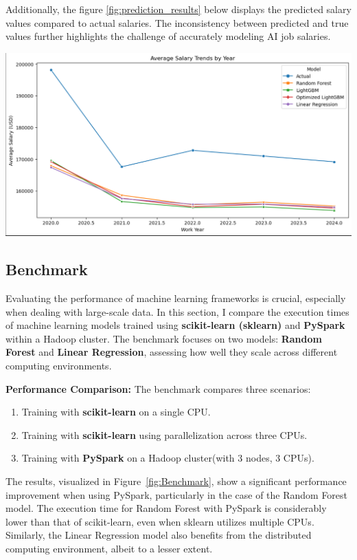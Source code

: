 \documentclass[12pt,a4paper]{article}
\begin{document}
\begin{multicols}{2}
Additionally, the figure \ref{fig:prediction_results} below displays the predicted salary values compared to actual salaries. The inconsistency between predicted and true values further highlights the challenge of accurately modeling AI job salaries.

\includegraphics[width=\linewidth]{prediction_result.jpg}
\label{fig:prediction_results}

\subsection{Benchmark}
Evaluating the performance of machine learning frameworks is crucial, especially when dealing with large-scale data. In this section, I compare the execution times of machine learning models trained using \textbf{scikit-learn (sklearn)} and \textbf{PySpark} within a Hadoop cluster. The benchmark focuses on two models: \textbf{Random Forest} and \textbf{Linear Regression}, assessing how well they scale across different computing environments.

\textbf{Performance Comparison:}  
The benchmark compares three scenarios:
\begin{enumerate}
    \item Training with \textbf{scikit-learn} on a single CPU.
    \item Training with \textbf{scikit-learn} using parallelization across three CPUs.
    \item Training with \textbf{PySpark} on a Hadoop cluster(with 3 nodes, 3 CPUs).
\end{enumerate}

The results, visualized in Figure~\ref{fig:Benchmark}, show a significant performance improvement when using PySpark, particularly in the case of the Random Forest model. The execution time for Random Forest with PySpark is considerably lower than that of scikit-learn, even when sklearn utilizes multiple CPUs. Similarly, the Linear Regression model also benefits from the distributed computing environment, albeit to a lesser extent.


\end{multicols}
\end{document}
